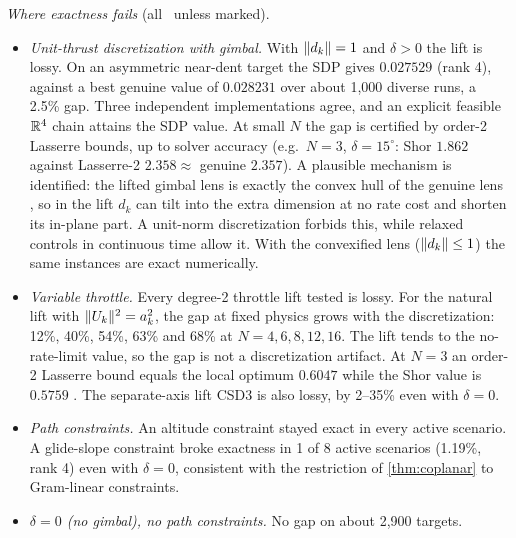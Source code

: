 \noindent\emph{Where exactness fails} (all \Snum\ unless marked).
\begin{itemize}[leftmargin=*,itemsep=2pt]
\item \emph{Unit-thrust discretization with gimbal.} With $\lVert d_k\rVert=1$ and $\delta>0$ the lift is lossy. On an asymmetric
near-dent target the SDP gives $0.027529$ (rank 4), against a best genuine value of $0.028231$ over about 1{,}000 diverse runs, a
2.5\% gap. Three independent implementations agree, and an explicit feasible $\mathbb{R}^4$ chain attains the SDP value. At small $N$
the gap is certified by order-2 Lasserre bounds, up to solver accuracy (e.g.\ $N=3$, $\delta=15^\circ$: Shor $1.862$ against Lasserre-2
$2.358\approx$ genuine $2.357$). A plausible mechanism is identified: the lifted gimbal lens is exactly the convex hull of the genuine
lens , so in the lift $d_k$ can tilt into the extra dimension at no rate cost and shorten its
in-plane part. A unit-norm discretization forbids this, while relaxed controls in continuous time allow it. With the
convexified lens ($\lVert d_k\rVert\le1$) the same instances are exact numerically.
\item \emph{Variable throttle.} Every degree-2 throttle lift tested is lossy. For the natural lift with $\lVert U_k\rVert^2=a_k^2$, the gap at
fixed physics grows with the discretization: 12\%, 40\%, 54\%, 63\% and 68\% at $N=4,6,8,12,16$. The lift tends to the
no-rate-limit value, so the gap is not a discretization artifact. At $N=3$ an order-2 Lasserre bound equals the local optimum
$0.6047$ while the Shor value is $0.5759$ . The separate-axis
lift CSD3 is also lossy, by 2--35\% even with $\delta=0$.
\item \emph{Path constraints.} An altitude constraint stayed exact in every active scenario. A glide-slope constraint broke exactness
in 1 of 8 active scenarios (1.19\%, rank 4) even with $\delta=0$, consistent with the restriction of \cref{thm:coplanar} to
Gram-linear constraints.
\item \emph{$\delta=0$ (no gimbal), no path constraints.} No gap on about 2{,}900 targets.
\end{itemize}

